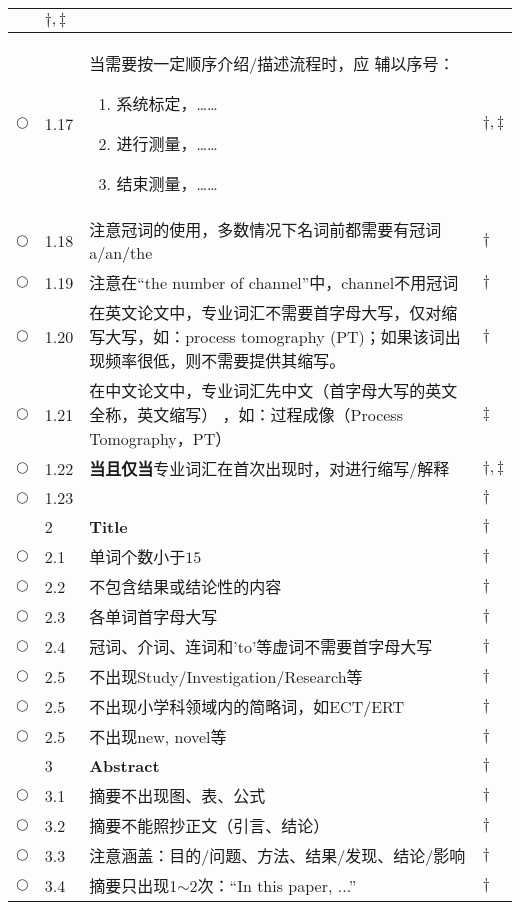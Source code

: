 \documentclass{ctexart}
\begin{document}
\begin{center}
\begin{longtable}{|l|l|p{}|l|}
\begin{itemize}
\end{itemize}
& $\dagger, \ddagger$\\\hline
$\bigcirc$& 1.17 & 当需要按一定顺序介绍/描述流程时，应 辅以序号：
\begin{enumerate}
  \item 系统标定，……
  \item 进行测量，……
  \item 结束测量，……
\end{enumerate}
& $\dagger, \ddagger$\\\hline
$\bigcirc$& 1.18 & 注意冠词的使用，多数情况下名词前都需要有冠词a/an/the & $\dagger$\\\hline
$\bigcirc$& 1.19 & 注意在“the number of channel”中，channel不用冠词 & $\dagger$\\\hline
$\bigcirc$& 1.20 & 在英文论文中，专业词汇不需要首字母大写，仅对缩写大写，如：process tomography (PT)；如果该词出现频率很低，则不需要提供其缩写。 & $\dagger$\\\hline
$\bigcirc$& 1.21 & 在中文论文中，专业词汇先中文（首字母大写的英文全称，英文缩写） ，如：过程成像（Process Tomography，PT）& $\ddagger$\\\hline
$\bigcirc$& 1.22 & \textbf{当且仅当}专业词汇在首次出现时，对进行缩写/解释 & $\dagger, \ddagger$\\\hline
$\bigcirc$& 1.23 &  & $\dagger$\\\hline
\hline

 & 2 & \textcolor[rgb]{0.00,0.00,1.00}{\textbf{Title}}& $\dagger$\\\hline
$\bigcirc$ & 2.1 & 单词个数小于$15$& $\dagger$\\\hline
$\bigcirc$ & 2.2 & 不包含结果或结论性的内容 & $\dagger$\\\hline
$\bigcirc$ & 2.3 & 各单词首字母大写& $\dagger$\\\hline
$\bigcirc$ & 2.4 & 冠词、介词、连词和'to'等虚词不需要首字母大写& $\dagger$\\\hline
$\bigcirc$ & 2.5 & 不出现Study/Investigation/Research等& $\dagger$\\\hline
$\bigcirc$ & 2.5 & 不出现小学科领域内的简略词，如ECT/ERT& $\dagger$\\\hline
$\bigcirc$ & 2.5 & 不出现new, novel等& $\dagger$\\\hline
\hline


$ $ & 3 & \textcolor[rgb]{0.00,0.00,1.00}{\textbf{Abstract}}& $\dagger$\\\hline
$\bigcirc$ & 3.1 & 摘要不出现图、表、公式& $\dagger$\\\hline
$\bigcirc$ & 3.2 & 摘要不能照抄正文（引言、结论）& $\dagger$\\\hline
$\bigcirc$ & 3.3 & 注意涵盖：目的/问题、方法、结果/发现、结论/影响& $\dagger$\\\hline
$\bigcirc$ & 3.4 & 摘要只出现1$\sim$2次：“In this paper, ...”& $\dagger$\\\hline
\hline


\end{longtable}
\end{center}
\end{document}
